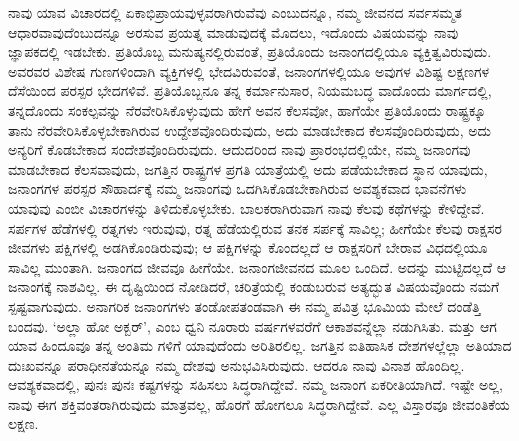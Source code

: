 ನಾವು ಯಾವ ವಿಚಾರದಲ್ಲಿ ಏಕಾಭಿಪ್ರಾಯವುಳ್ಳವರಾಗಿರುವೆವು ಎಂಬುದನ್ನೂ, ನಮ್ಮ ಜೀವನದ ಸರ್ವಸಮ್ಮತ ಆಧಾರವಾವುದೆಂಬುದನ್ನೂ ಅರಸುವ ಪ್ರಯತ್ನ ಮಾಡುವುದಕ್ಕೆ ಮೊದಲು, ಇದೊಂದು ವಿಷಯವನ್ನು ನಾವು ಜ್ಞಾಪಕದಲ್ಲಿ ಇಡಬೇಕು. ಪ್ರತಿಯೊಬ್ಬ ಮನುಷ್ಯನಲ್ಲಿರುವಂತೆ, ಪ್ರತಿಯೊಂದು ಜನಾಂಗದಲ್ಲಿಯೂ ವ್ಯಕ್ತಿತ್ವವಿರುವುದು. ಅವರವರ ವಿಶೇಷ ಗುಣಗಳಿಂದಾಗಿ ವ್ಯಕ್ತಿಗಳಲ್ಲಿ ಭೇದವಿರುವಂತೆ, ಜನಾಂಗಗಳಲ್ಲಿಯೂ ಅವುಗಳ ವಿಶಿಷ್ಟ ಲಕ್ಷಣಗಳ ದೆಸೆಯಿಂದ ಪರಸ್ಪರ ಭೇದಗಳಿವೆ. ಪ್ರತಿಯೊಬ್ಬನೂ ತನ್ನ ಕರ್ಮಾನುಸಾರ, ನಿಯಮಬದ್ಧ ವಾದೊಂದು ಮಾರ್ಗದಲ್ಲಿ, ತನ್ನದೊಂದು ಸಂಕಲ್ಪವನ್ನು ನೆರವೇರಿಸಿಕೊಳ್ಳುವುದು ಹೇಗೆ ಅವನ ಕೆಲಸವೋ, ಹಾಗೆಯೇ ಪ್ರತಿಯೊಂದು ರಾಷ್ಟ್ರಕ್ಕೂ ತಾನು ನೆರವೇರಿಸಿಕೊಳ್ಳಬೇಕಾಗಿರುವ ಉದ್ದೇಶವೊಂದಿರುವುದು, ಅದು ಮಾಡಬೇಕಾದ ಕೆಲಸವೊಂದಿರುವುದು, ಅದು ಅನ್ಯರಿಗೆ ಕೊಡಬೇಕಾದ ಸಂದೇಶವೊಂದಿರುವುದು. ಆದುದರಿಂದ ನಾವು ಪ್ರಾರಂಭದಲ್ಲಿಯೇ, ನಮ್ಮ ಜನಾಂಗವು ಮಾಡಬೇಕಾದ ಕೆಲಸವಾವುದು, ಜಗತ್ತಿನ ರಾಷ್ಟ್ರಗಳ ಪ್ರಗತಿ ಯಾತ್ರೆಯಲ್ಲಿ ಅದು ಪಡೆಯಬೇಕಾದ ಸ್ಥಾನ ಯಾವುದು, ಜನಾಂಗಗಳ ಪರಸ್ಪರ ಸೌಹಾರ್ದಕ್ಕೆ ನಮ್ಮ ಜನಾಂಗವು ಒದಗಿಸಿಕೊಡಬೇಕಾಗಿರುವ ಅವಶ್ಯಕವಾದ ಭಾವನೆಗಳು ಯಾವುವು ಎಂಬೀ ವಿಚಾರಗಳನ್ನು ತಿಳಿದುಕೊಳ್ಳಬೇಕು. ಬಾಲಕರಾಗಿರುವಾಗ ನಾವು ಕೆಲವು ಕಥೆಗಳನ್ನು ಕೇಳಿದ್ದೇವೆ. ಸರ್ಪಗಳ ಹೆಡೆಗಳಲ್ಲಿ ರತ್ನಗಳು ಇರುವುವು, ರತ್ನ ಹೆಡೆಯಲ್ಲಿರುವ ತನಕ ಸರ್ಪಕ್ಕೆ ಸಾವಿಲ್ಲ; ಹೀಗೆಯೇ ಕೆಲವು ರಾಕ್ಷಸರ ಜೀವಗಳು ಪಕ್ಷಿಗಳಲ್ಲಿ ಅಡಗಿಕೊಂಡಿರುವುವು; ಆ ಪಕ್ಷಿಗಳನ್ನು ಕೊಂದಲ್ಲದೆ ಆ ರಾಕ್ಷಸರಿಗೆ ಬೇರಾವ ವಿಧದಲ್ಲಿಯೂ ಸಾವಿಲ್ಲ ಮುಂತಾಗಿ. ಜನಾಂಗದ ಜೀವವೂ ಹೀಗೆಯೇ. ಜನಾಂಗಜೀವನದ ಮೂಲ ಒಂದಿದೆ. ಅದನ್ನು ಮುಟ್ಟಿದಲ್ಲದೆ ಆ ಜನಾಂಗಕ್ಕೆ ನಾಶವಿಲ್ಲ. ಈ ದೃಷ್ಟಿಯಿಂದ ನೋಡಿದರೆ, ಚರಿತ್ರೆಯಲ್ಲಿ ಕಂಡುಬರುವ ಅತ್ಯದ್ಭುತ ವಿಷಯವೊಂದು ನಮಗೆ ಸ್ಪಷ್ಟವಾಗುವುದು. ಅನಾಗರಿಕ ಜನಾಂಗಗಳು ತಂಡೋಪತಂಡವಾಗಿ ಈ ನಮ್ಮ ಪವಿತ್ರ ಭೂಮಿಯ ಮೇಲೆ ದಂಡೆತ್ತಿ ಬಂದವು. `ಅಲ್ಲಾ ಹೋ ಅಕ್ಬರ್​’, ಎಂಬ ಧ್ವನಿ ನೂರಾರು ವರ್ಷಗಳವರೆಗೆ ಆಕಾಶವನ್ನೆಲ್ಲಾ ನಡುಗಿಸಿತು. ಮತ್ತು ಆಗ ಯಾವ ಹಿಂದೂವೂ ತನ್ನ ಅಂತಿಮ ಗಳಿಗೆ ಯಾವುದೆಂದು ಅರಿತಿರಲಿಲ್ಲ. ಜಗತ್ತಿನ ಐತಿಹಾಸಿಕ ದೇಶಗಳಲ್ಲೆಲ್ಲಾ ಅತಿಯಾದ ದುಃಖವನ್ನೂ ಪರಾಧೀನತೆಯನ್ನೂ ನಮ್ಮ ದೇಶವು ಅನುಭವಿಸಿರುವುದು. ಆದರೂ ನಾವು ವಿನಾಶ ಹೊಂದಿಲ್ಲ. ಆವಶ್ಯಕವಾದಲ್ಲಿ, ಪುನಃ ಪುನಃ ಕಷ್ಟಗಳನ್ನು ಸಹಿಸಲು ಸಿದ್ಧರಾಗಿದ್ದೇವೆ. ನಮ್ಮ ಜನಾಂಗ ಏಕರೀತಿಯಾಗಿದೆ. ಇಷ್ಟೇ ಅಲ್ಲ, ನಾವು ಈಗ ಶಕ್ತಿವಂತರಾಗಿರುವುದು ಮಾತ್ರವಲ್ಲ, ಹೊರಗೆ ಹೋಗಲೂ ಸಿದ್ಧರಾಗಿದ್ದೇವೆ. ಎಲ್ಲ ವಿಸ್ತಾರವೂ ಜೀವಂತಿಕೆಯ ಲಕ್ಷಣ.

